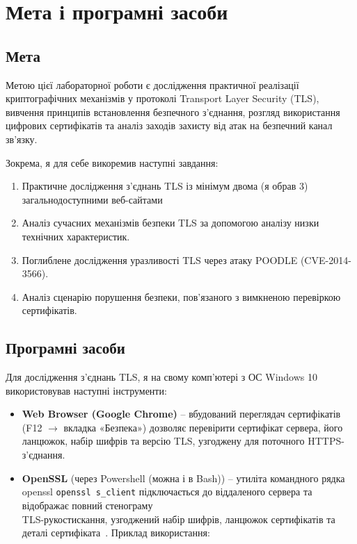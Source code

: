 \section{Мета і програмні засоби}
\label{sec:objective}

\subsection{Мета}

Метою цієї лабораторної роботи є дослідження практичної реалізації криптографічних механізмів у протоколі 
Transport Layer Security (TLS), вивчення принципів встановлення безпечного з'єднання, розгляд використання 
цифрових сертифікатів та аналіз заходів захисту від атак на безпечний канал зв'язку.

Зокрема, я для себе викоремив наступні завдання:
\begin{enumerate}[label=\arabic*.]
    \item Практичне дослідження з'єднань TLS із мінімум двома (я обрав 3) загальнодоступними веб-сайтами
    \item Аналіз сучасних механізмів безпеки TLS за допомогою аналізу низки технічних характеристик.
    \item Поглиблене дослідження уразливості TLS через атаку POODLE (CVE-2014-3566).
    \item Аналіз сценарію порушення безпеки, пов'язаного з вимкненою перевіркою сертифікатів.
\end{enumerate}

\subsection{Програмні засоби}

Для дослідження з'єднань TLS, я на свому комп'ютері з ОС Windows 10 використовував наступні інструменти:
\begin{itemize}
    \item \textbf{Web Browser (Google Chrome)} -- вбудований переглядач сертифікатів (F12 $\rightarrow$ вкладка 
        «Безпека») дозволяє перевірити сертифікат сервера, його ланцюжок, набір шифрів та версію TLS, узгоджену для 
        поточного HTTPS-з'єднання.
    \item \textbf{OpenSSL} (через Powershell (можна і в Bash)) -- утиліта командного рядка openssl 
        \texttt{openssl s\_client} підключається до віддаленого сервера та відображає повний стенограму \\ 
        TLS-рукостискання, узгоджений набір шифрів, ланцюжок сертифікатів та деталі сертифіката~\cite{openssl_docs}. Приклад використання:
\end{itemize}

